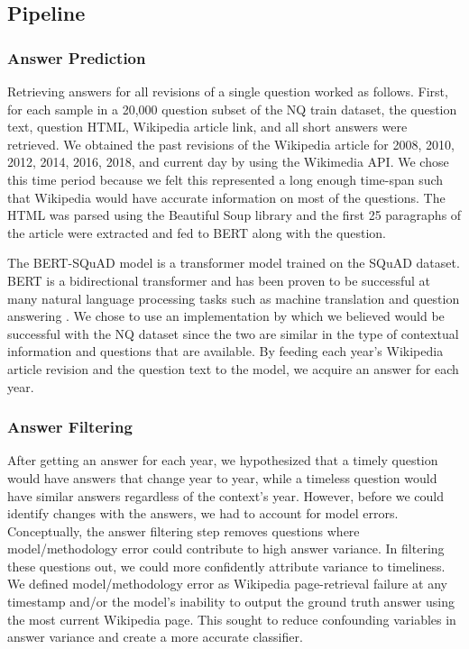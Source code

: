 \documentclass{article}
\begin{document}
\subsection{Pipeline}
\label{pipeline}


\subsubsection{Answer Prediction}
Retrieving answers for all revisions of a single question worked as follows.
First, for each sample in a 20,000 question subset of the NQ train dataset, the
question text, question HTML, Wikipedia article link, and all short answers were
retrieved. We obtained the past revisions of the Wikipedia article for 2008,
2010, 2012, 2014, 2016, 2018, and current day by using the Wikimedia API. We
chose this time period because we felt this represented a long enough time-span
such that Wikipedia would have accurate information on most of the questions.
The HTML was parsed using the Beautiful Soup library and the first 25 paragraphs
of the article were extracted and fed to BERT along with the question.

The BERT-SQuAD model is a transformer model trained on the SQuAD dataset. BERT
is a bidirectional transformer and has been proven to be successful at many
natural language processing tasks such as machine translation and question
answering \cite{bert}. We chose to use an implementation by \cite{bertsquad}
which we believed would be successful with the NQ dataset since the two are
similar in the type of contextual information and questions that are available.
By feeding each year’s Wikipedia article revision and the question text to the
model, we acquire an answer for each year.

\subsubsection{Answer Filtering}


After getting an answer for each year, we hypothesized that a timely question
would have answers that change year to year, while a timeless question would
have similar answers regardless of the context's year. However, before we could
identify changes with the answers, we had to account for model errors.
Conceptually, the answer filtering step removes questions where
model/methodology error could contribute to high answer variance. In filtering
these questions out, we could more confidently attribute variance to timeliness.
We defined model/methodology error as Wikipedia page-retrieval failure at any
timestamp and/or the model's inability to output the ground truth answer using
the most current Wikipedia page. This sought to reduce confounding variables in
answer variance and create a more accurate classifier.
\end{document}
